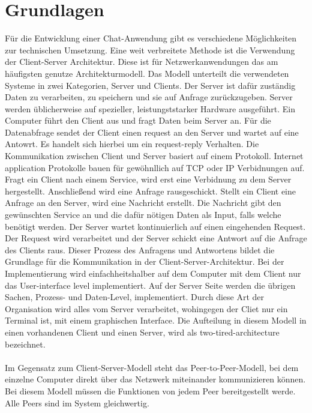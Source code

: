 \section{Grundlagen}
Für die Entwicklung einer Chat-Anwendung gibt es verschiedene Möglichkeiten zur technischen Umsetzung.
Eine weit verbreitete Methode ist die Verwendung der Client-Server Architektur. Diese ist für Netzwerkanwendungen das am häufigsten genutze Architekturmodell. 
Das Modell unterteilt die verwendeten Systeme in zwei Kategorien, Server und Clients.
Der Server ist dafür zuständig Daten zu verarbeiten, zu speichern und sie auf Anfrage zurückzugeben. Server werden üblicherweise auf spezieller, leistungststarker Hardware ausgeführt.  
Ein Computer führt den Client aus und fragt Daten beim Server an\cite{client-server_2019}. 
Für die Datenabfrage sendet der Client einen request an den Server und wartet auf eine Antowrt.
Es handelt sich hierbei um ein request-reply Verhalten.
Die Kommunikation zwischen Client und Server basiert auf einem Protokoll. 
Internet application Protokolle bauen für gewöhnllich auf TCP oder IP Verbidnungen auf\cite[S. 79ff]{steen23}. 
Fragt ein Client nach einem Service, wird erst eine Verbidnung zu dem Server hergestellt. Anschließend wird eine Anfrage rausgeschickt.
Stellt ein Client eine Anfrage an den Server, wird eine Nachricht erstellt. Die Nachricht gibt den gewünschten Service an und die dafür nötigen Daten als Input, falls welche benötigt werden.
Der Server wartet kontinuierlich auf einen eingehenden Request. Der Request wird verarbeitet und der Server schickt eine Antwort auf die Anfrage des Clients raus\cite{tan10}.
Dieser Prozess des Anfragens und Antwortens bildet die Grundlage für die Kommunikation in der Client-Server-Architektur.
Bei der Implementierung wird einfachheitshalber auf dem Computer mit dem Client nur das User-interface level implementiert.
Auf der Server Seite werden die übrigen Sachen, Prozess- und Daten-Level, implementiert.
Durch diese Art der Organisation wird alles vom Server verarbeitet, wohingegen der Cliet nur ein Terminal ist, mit einem graphischen Interface.
Die Aufteilung in diesem Modell in einen vorhandenen Client und einen Server, wird als two-tired-architecture bezeichnet\cite[S. 80]{steen23}.
\\
\\
Im Gegensatz zum Client-Server-Modell steht das Peer-to-Peer-Modell, bei dem einzelne Computer direkt über das Netzwerk miteinander kommunizieren können.
Bei diesem Modell müssen die Funktionen von jedem Peer bereitgestellt werde. Alle Peers sind im System gleichwertig.
